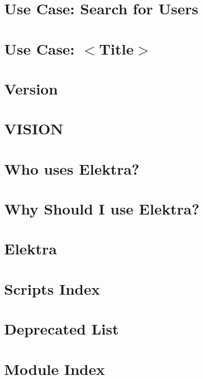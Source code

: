 \let\mypdfximage\pdfximage\def\pdfximage{\immediate\mypdfximage}\documentclass[twoside]{book}
\newcommand{\+}{\discretionary{\mbox{\scriptsize$\hookleftarrow$}}{}{}}
\begin{document}
\chapter{Use Case\+: Search for Users}
\label{doc_usecases_snippet_sharing_UC_search_user_md}

\chapter{Use Case\+: $<$Title$>$}
\label{doc_usecases_template_md}

\chapter{Version}
\label{doc_VERSION_md}

\chapter{VISION}
\label{doc_VISION_md}

\chapter{Who uses Elektra?}
\label{doc_WHO_md}

\chapter{Why Should I use Elektra?}
\label{doc_WHY_md}

\chapter{Elektra}
\label{README_md}

\chapter{Scripts Index}
\label{scripts_README_md}

\chapter{Deprecated List}
\label{deprecated}

\chapter{Module Index}

\end{document}
